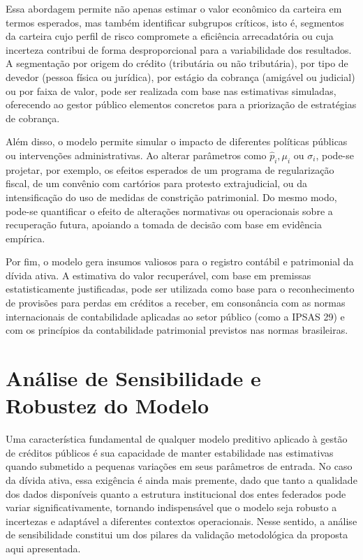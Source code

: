 \documentclass[a4paper,12pt]{article}
\begin{document}
Essa abordagem permite não apenas estimar o valor econômico da carteira em termos esperados, mas também identificar subgrupos críticos, isto é, segmentos da carteira cujo perfil de risco compromete a eficiência arrecadatória ou cuja incerteza contribui de forma desproporcional para a variabilidade dos resultados. A segmentação por origem do crédito (tributária ou não tributária), por tipo de devedor (pessoa física ou jurídica), por estágio da cobrança (amigável ou judicial) ou por faixa de valor, pode ser realizada com base nas estimativas simuladas, oferecendo ao gestor público elementos concretos para a priorização de estratégias de cobrança.

Além disso, o modelo permite simular o impacto de diferentes políticas públicas ou intervenções administrativas. Ao alterar parâmetros como 
$\hat{p}_{i}, \mu_{i}$ ou $\sigma_{i}$, pode-se projetar, por exemplo, os efeitos esperados de um programa de regularização fiscal, de um convênio com cartórios para protesto extrajudicial, ou da intensificação do uso de medidas de constrição patrimonial. Do mesmo modo, pode-se quantificar o efeito de alterações normativas ou operacionais sobre a recuperação futura, apoiando a tomada de decisão com base em evidência empírica.

Por fim, o modelo gera insumos valiosos para o registro contábil e patrimonial da dívida ativa. A estimativa do valor recuperável, com base em premissas estatisticamente justificadas, pode ser utilizada como base para o reconhecimento de provisões para perdas em créditos a receber, em consonância com as normas internacionais de contabilidade aplicadas ao setor público (como a IPSAS 29) e com os princípios da contabilidade patrimonial previstos nas normas brasileiras.

\section{Análise de Sensibilidade e Robustez do Modelo}
Uma característica fundamental de qualquer modelo preditivo aplicado à gestão de créditos públicos é sua capacidade de manter estabilidade nas estimativas quando submetido a pequenas variações em seus parâmetros de entrada. No caso da dívida ativa, essa exigência é ainda mais premente, dado que tanto a qualidade dos dados disponíveis quanto a estrutura institucional dos entes federados pode variar significativamente, tornando indispensável que o modelo seja robusto a incertezas e adaptável a diferentes contextos operacionais. Nesse sentido, a análise de sensibilidade constitui um dos pilares da validação metodológica da proposta aqui apresentada.
\end{document}
